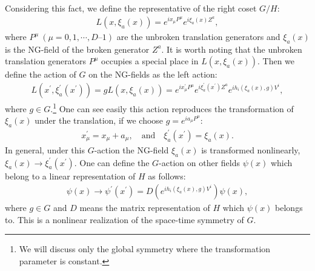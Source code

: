 \documentclass[a4paper,12pt]{article}
\begin{document}
Considering this fact, we define the representative of the right coset 
$G/H$:
\begin{eqnarray}
L(x, \xi_{a}(x)) = e^{i x_{\mu} P^{\mu}} e^{i \xi_{a}(x) Z^{a}},
\end{eqnarray}
where $P^{\mu}~(\mu = 0,1,\cdots, D\textrm{--}1)$ are the unbroken 
translation generators and $\xi_{a}(x)$ is the NG-field
of the broken generator $Z^{a}$.
It is worth noting that the unbroken translation generators 
$P^{\mu}$ occupies a special place in $L(x,\xi_{a}(x))$.
Then we define the action of $G$ on the NG-fields as the left action:
\begin{eqnarray}
L(x^{'}, \xi_{a}^{'}(x^{'})) = g L(x, \xi_{a}(x)) = e^{i x^{'}_{\mu} P^{\mu}} 
e^{i \xi^{'}_{a}(x^{'}) Z^{a}} e^{i h_{i}(\xi_{a}(x), g) V^{i}},
\end{eqnarray}
where $g \in G$.\footnote{We will discuss only the global
symmetry where the transformation parameter is constant.}
One can see easily this action reproduces the transformation of
$\xi_{a}(x)$ under the translation, if we choose $g = e^{i a_{\mu} P^{\mu}}$:
\begin{eqnarray}
x^{'}_{\mu} = x_{\mu} + a_{\mu}, \quad \textrm{and} \quad 
\xi^{'}_{a}(x^{'}) = \xi_{a}(x).
\end{eqnarray}      
In general, under this $G$-action the NG-field $\xi_{a}(x)$ is transformed
nonlinearly, $\xi_{a}(x) \rightarrow \xi^{'}_{a}(x^{'})$.
One can define the $G$-action on other fields $\psi(x)$ 
which belong to a linear representation of $H$ as follows:
\begin{eqnarray}
\psi(x) \rightarrow \psi^{'}(x^{'}) = D \left(e^{i h_{i}(\xi_{a}(x),g)
V^{i}} \right) \psi(x),
\end{eqnarray}
where $g \in G$ and $D$ means the matrix representation of $H$  
which $\psi(x)$ belongs to. This is a nonlinear realization of the
space-time symmetry of $G$.
\end{document}

